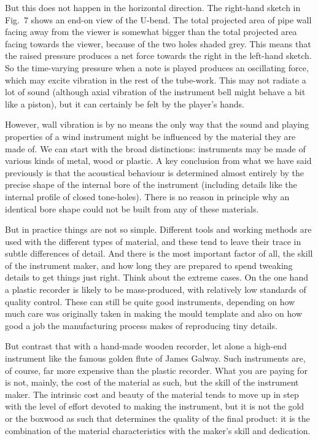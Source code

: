 
  But this does not happen in the horizontal direction. The right-hand sketch 
  in Fig.\ 7 shows an end-on view of the U-bend. The total projected area of 
  pipe wall facing away from the viewer is somewhat bigger than the total 
  projected area facing towards the viewer, because of the two holes shaded 
  grey. This means that the raised pressure produces a net force towards the 
  right in the left-hand sketch. So the time-varying pressure when a note is 
  played produces an oscillating force, which may excite vibration in the rest 
  of the tube-work. This may not radiate a lot of sound (although axial 
  vibration of the instrument bell might behave a bit like a piston), but it 
  can certainly be felt by the player’s hands. 

  However, wall vibration is by no means the only way that the sound and 
  playing properties of a wind instrument might be influenced by the material 
  they are made of. We can start with the broad distinctions: instruments may 
  be made of various kinds of metal, wood or plastic. A key conclusion from 
  what we have said previously is that the acoustical behaviour is determined 
  almost entirely by the precise shape of the internal bore of the instrument 
  (including details like the internal profile of closed tone-holes). There is 
  no reason in principle why an identical bore shape could not be built from 
  any of these materials. 

  But in practice things are not so simple. Different tools and working methods 
  are used with the different types of material, and these tend to leave their 
  trace in subtle differences of detail. And there is the most important factor 
  of all, the skill of the instrument maker, and how long they are prepared to 
  spend tweaking details to get things just right. Think about the extreme 
  cases. On the one hand a plastic recorder is likely to be mass-produced, with 
  relatively low standards of quality control. These can still be quite good 
  instruments, depending on how much care was originally taken in making the 
  mould template and also on how good a job the manufacturing process makes of 
  reproducing tiny details. 

  But contrast that with a hand-made wooden recorder, let alone a high-end 
  instrument like the famous golden flute of James Galway. Such instruments 
  are, of course, far more expensive than the plastic recorder. What you are 
  paying for is not, mainly, the cost of the material as such, but the skill of 
  the instrument maker. The intrinsic cost and beauty of the material tends to 
  move up in step with the level of effort devoted to making the instrument, 
  but it is not the gold or the boxwood as such that determines the quality of 
  the final product: it is the combination of the material characteristics with 
  the maker’s skill and dedication. 

